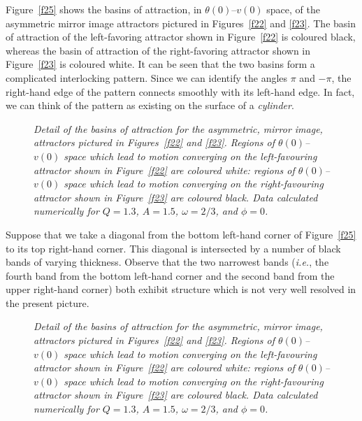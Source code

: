 Figure~\ref{f25} shows the basins of attraction, in $\theta(0)$--$v(0)$ space, 
of the asymmetric mirror image attractors
pictured in Figures~\ref{f22} and \ref{f23}. The basin of attraction
of  the left-favoring attractor shown in Figure~\ref{f22} is coloured black, whereas
the basin of attraction
of  the right-favoring attractor shown in Figure~\ref{f23} is coloured  white. It can
be seen that the two basins form a complicated interlocking pattern. Since we can
identify the angles $\pi$ and $-\pi$, the right-hand edge of the pattern connects
smoothly with its left-hand edge. In fact, we can think of the pattern as existing
on the surface of a {\em cylinder}.

\begin{figure}
\epsfysize=3.5in
\centerline{}
\caption{\em  Detail of the basins of attraction for the asymmetric, mirror image, attractors
pictured in Figures~\ref{f22} and \ref{f23}. Regions of $\theta(0)$--$v(0)$
space which lead to motion converging on the left-favouring attractor shown
in Figure~\ref{f22} are coloured white: regions of $\theta(0)$--$v(0)$
space which lead to motion converging on the right-favouring attractor shown
in Figure~\ref{f23} are coloured black. Data calculated numerically
for $Q=1.3$, $A=1.5$, $\omega=2/3$, and $\phi=0$.
}\label{f26}
\end{figure}

Suppose that we take a diagonal from the bottom left-hand corner of Figure~\ref{f25}
to its top right-hand corner. This diagonal is intersected by a number of black
bands of varying thickness. Observe that the two narrowest bands ({\em i.e.}, the
fourth band from the bottom left-hand corner and the second band from the
upper right-hand corner) both exhibit structure which is not very well resolved in the
present picture. 

\begin{figure}
\epsfysize=3.5in
\centerline{}
\caption{\em  Detail of the basins of attraction for the asymmetric, mirror image, attractors
pictured in Figures~\ref{f22} and \ref{f23}. Regions of $\theta(0)$--$v(0)$
space which lead to motion converging on the left-favouring attractor shown
in Figure~\ref{f22} are coloured white: regions of $\theta(0)$--$v(0)$
space which lead to motion converging on the right-favouring attractor shown
in Figure~\ref{f23} are coloured black. Data calculated numerically
for $Q=1.3$, $A=1.5$, $\omega=2/3$, and $\phi=0$.
}\label{f27}
\end{figure}

